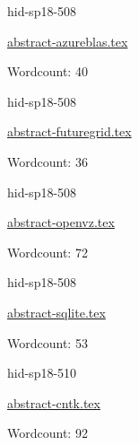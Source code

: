 

\begin{IU}

hid-sp18-508

\href{https://github.com/cloudmesh-community/hid-sp18-508/blob/master//technology/abstract-azureblas.tex}{abstract-azureblas.tex}

 

Wordcount: 40

\end{IU}



\begin{IU}

hid-sp18-508

\href{https://github.com/cloudmesh-community/hid-sp18-508/blob/master//technology/abstract-futuregrid.tex}{abstract-futuregrid.tex}

 

Wordcount: 36

\end{IU}



\begin{IU}

hid-sp18-508

\href{https://github.com/cloudmesh-community/hid-sp18-508/blob/master//technology/abstract-openvz.tex}{abstract-openvz.tex}

 

Wordcount: 72

\end{IU}



\begin{IU}

hid-sp18-508

\href{https://github.com/cloudmesh-community/hid-sp18-508/blob/master//technology/abstract-sqlite.tex}{abstract-sqlite.tex}

 

Wordcount: 53

\end{IU}



\begin{IU}

hid-sp18-510

\href{https://github.com/cloudmesh-community/hid-sp18-510/blob/master//technology/abstract-cntk.tex}{abstract-cntk.tex}

 

Wordcount: 92

\end{IU}

